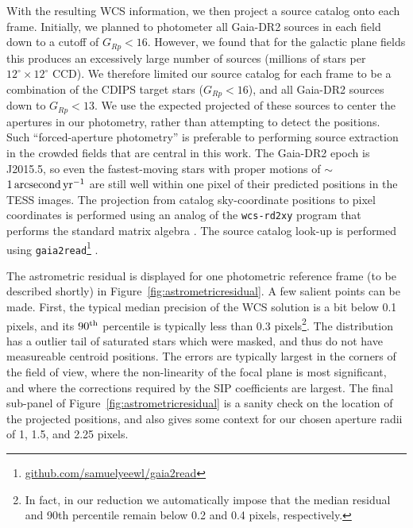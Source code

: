 \documentclass[12pt,twocolumn,tighten]{aastex62}
\begin{document}
With the resulting WCS information, we then project a source catalog
onto each frame.  Initially, we planned to photometer all Gaia-DR2
sources in each field down to a cutoff of $G_{Rp} < 16$.  However, we
found that for the galactic plane fields this produces an excessively
large number of sources (millions of stars per
$12^\circ\times12^\circ$ CCD).  We therefore limited our source
catalog for each frame to be
a combination of the CDIPS target stars ($G_{Rp} < 16$), and
all Gaia-DR2 sources down to $G_{Rp} < 13$.  We use the expected
projected of these sources to center the apertures in our photometry,
rather than attempting to detect the positions.  Such
``forced-aperture photometry'' is preferable to performing source
extraction in the crowded fields that are central in this work.  The
Gaia-DR2 epoch is J2015.5, so even the fastest-moving stars with
proper motions of $\sim$$1\,{\rm arcsecond}\,{\rm yr}^{-1}$ are still
well within one pixel of their predicted positions in the TESS images.
The projection from catalog sky-coordinate positions to pixel
coordinates is performed using an analog of the \texttt{wcs-rd2xy}
program that performs the standard matrix algebra \citep{lang_2010}.
The source catalog look-up is performed using
\texttt{gaia2read}\footnote{\url{github.com/samuelyeewl/gaia2read}}
\citep{kim_2018_gaia2read}.

The astrometric residual is displayed for one photometric reference
frame (to be described shortly) in
Figure~\ref{fig:astrometricresidual}.
A few salient points can be made.
First, the typical median precision of the WCS solution is a bit below
0.1 pixels, and its $90^{\rm th}$ percentile is typically less than
0.3 pixels\footnote{In fact, in our reduction we automatically impose
that the median residual and 90th percentile remain below 0.2 and 0.4
pixels, respectively.}.
The distribution has a outlier tail of saturated stars which were
masked, and thus do not have measureable centroid positions.
The errors are typically largest in the corners of the field of view,
where the non-linearity of the focal plane is most significant, and
where the corrections required by the SIP coefficients are largest.
The final sub-panel of Figure~\ref{fig:astrometricresidual} is a
sanity check on the location of the projected positions, and also
gives some context for our chosen aperture radii of 1, 1.5, and 2.25
pixels.
\end{document}
